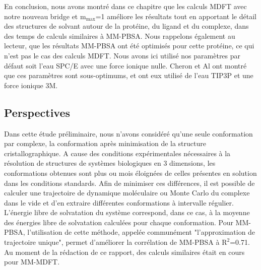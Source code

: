 




En conclusion, nous avons montré dans ce chapitre que les calculs MDFT avec notre nouveau bridge et $\mathrm{m}_\mathrm{max}$=1 améliore les résultats tout en apportant le détail des structures de solvant autour de la protéine, du ligand et du complexe, dans des temps de calculs similaires à MM-PBSA. Nous rappelons également au lecteur, que les résultats MM-PBSA ont été optimisés pour cette protéine, ce qui n'est pas le cas des calculs MDFT. Nous avons ici utilisé nos paramètres par défaut soit l'eau SPC/E avec une force ionique nulle. Cheron et Al ont montré que ces paramètres sont sous-optimums, et ont eux utilisé de l'eau TIP3P et une force ionique 3M.




\subsection{Perspectives}
Dans cette étude préliminaire, nous n'avons considéré qu'une seule conformation par complexe, la conformation après minimisation de la structure cristallographique. A cause des conditions expérimentales nécessaires à la résolution de structures de systèmes biologiques en 3 dimensions, les conformations obtenues sont plus ou mois éloignées de celles présentes en solution dans les conditions standards. Afin de minimiser ces différences, il est possible de calculer une trajectoire de dynamique moléculaire ou Monte Carlo du complexe dans le vide et d'en extraire différentes conformations à intervalle régulier. 
L'énergie libre de solvatation du système correspond, dans ce cas, à la moyenne des énergies libre de solvatation calculées pour chaque conformation. Pour MM-PBSA, l'utilisation de cette méthode, appelée communément "l'approximation de trajectoire unique", permet d'améliorer la corrélation de MM-PBSA à $\mathrm{R}^2$=0.71. Au moment de la rédaction de ce rapport, des calculs similaires était en cours pour MM-MDFT.


